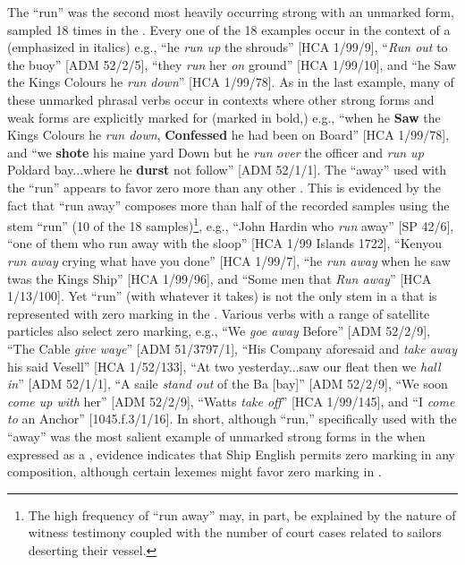 The  “run” was the second most heavily occurring strong  with an unmarked  form, sampled 18 times in the . Every one of the 18 examples occur in the context of a  (emphasized in italics) e.g., “he \textit{run up} the shrouds” [HCA 1/99/9], “\textit{Run out} to the buoy” [ADM 52/2/5], “they \textit{run} her \textit{on} ground” [HCA 1/99/10], and “he Saw the Kings Colours he \textit{run down}” [HCA 1/99/78]. As in the last example, many of these unmarked phrasal verbs occur in contexts where other strong  forms and weak  forms are explicitly marked for  (marked in bold,) e.g., “when he \textbf{Saw} the Kings Colours he \textit{run down}, \textbf{Confessed} he had been on Board” [HCA 1/99/78], and “we \textbf{shote} his maine yard Down but he \textit{run over} the officer and \textit{run up} Poldard bay...where he \textbf{durst} not follow” [ADM 52/1/1]. The  “away” used with the  “run” appears to favor zero  more than any other . This is evidenced by the fact that “run away” composes more than half of the recorded samples using the  stem “run” (10 of the 18 samples)\footnote{The high frequency of “run away” may, in part, be explained by the nature of witness testimony coupled with the number of court cases related to sailors deserting their vessel.}, e.g., “John Hardin who \textit{run} away” [SP 42/6], “one of them who run away with the sloop” [HCA 1/99  Islands 1722], “Kenyou \textit{run away} crying what have you done” [HCA 1/99/7], “he \textit{run away} when he saw twas the Kings Ship” [HCA 1/99/96], and “Some men that \textit{Run away}” [HCA 1/13/100]. Yet “run” (with whatever  it takes) is not the only  stem in a  that is represented with zero marking in the . Various  verbs with a range of satellite particles also select zero marking, e.g., “We \textit{goe away} Before” [ADM 52/2/9], “The Cable \textit{give waye}” [ADM 51/3797/1], “His Company aforesaid and \textit{take away} his said Vesell” [HCA 1/52/133], “At two yesterday...saw our fleat then we \textit{hall in}” [ADM 52/1/1], “A saile \textit{stand out} of the Ba [bay]” [ADM 52/2/9], “We soon \textit{come up with} her” [ADM 52/2/9], “Watts \textit{take off}” [HCA 1/99/145], and “I \textit{come to} an Anchor” [1045.f.3/1/16]. In short, although “run,” specifically used with the  “away” was the most salient example of unmarked strong  forms in the  when expressed as a , evidence indicates that Ship English permits zero marking in any  composition, although certain lexemes might favor zero marking in . 

